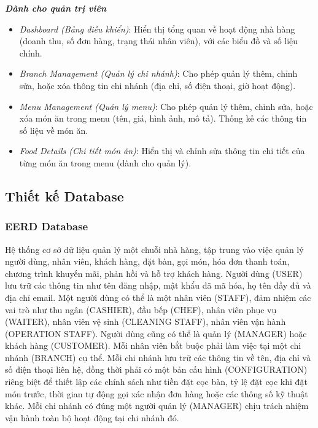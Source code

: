 \begin{enumerate}
        \textit{\textbf{Dành cho quản trị viên}}
        \begin{itemize}
            \item \textit{Dashboard (Bảng điều khiển)}: Hiển thị tổng quan về hoạt động nhà hàng (doanh thu, số đơn hàng, trạng thái nhân viên), với các biểu đồ và số liệu chính.
            \item \textit{Branch Management (Quản lý chi nhánh)}: Cho phép quản lý thêm, chỉnh sửa, hoặc xóa thông tin chi nhánh (địa chỉ, số điện thoại, giờ hoạt động).
            \item \textit{Menu Management (Quản lý menu)}: Cho phép quản lý thêm, chỉnh sửa, hoặc xóa món ăn trong menu (tên, giá, hình ảnh, mô tả). Thống kế các thông tin số liệu về món ăn.
            \item \textit{Food Details (Chi tiết món ăn)}: Hiển thị và chỉnh sửa thông tin chi tiết của từng món ăn trong menu (dành cho quản lý).
        \end{itemize}
    
\end{enumerate}

\subsection{Thiết kế Database}
\subsubsection{EERD Database}

Hệ thống cơ sở dữ liệu quản lý một chuỗi nhà hàng, tập trung vào việc quản lý người dùng, nhân viên, khách hàng, đặt bàn, gọi món, hóa đơn thanh toán, chương trình khuyến mãi, phản hồi và hỗ trợ khách hàng. Người dùng (USER) lưu trữ các thông tin như tên đăng nhập, mật khẩu đã mã hóa, họ tên đầy đủ và địa chỉ email. Một người dùng có thể là một nhân viên (STAFF), đảm nhiệm các vai trò như thu ngân (CASHIER), đầu bếp (CHEF), nhân viên phục vụ (WAITER), nhân viên vệ sinh (CLEANING STAFF), nhân viên vận hành (OPERATION STAFF). Người dùng cũng có thể là quản lý (MANAGER) hoặc khách hàng (CUSTOMER). Mỗi nhân viên bắt buộc phải làm việc tại một chi nhánh (BRANCH) cụ thể. Mỗi chi nhánh lưu trữ các thông tin về tên, địa chỉ và số điện thoại liên hệ, đồng thời phải có một bản cấu hình (CONFIGURATION) riêng biệt để thiết lập các chính sách như tiền đặt cọc bàn, tỷ lệ đặt cọc khi đặt món trước, thời gian tự động gọi xác nhận đơn hàng hoặc các thông số kỹ thuật khác. Mỗi chi nhánh có đúng một người quản lý (MANAGER) chịu trách nhiệm vận hành toàn bộ hoạt động tại chi nhánh đó.

